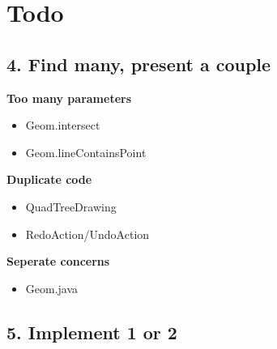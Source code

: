\section{Todo}
\subsection{4. Find many, present a couple}

\begin{flushleft}
\textbf{Too many parameters}
\begin{itemize}
	\item Geom.intersect
	\item Geom.lineContainsPoint
\end{itemize}
\end{flushleft}

\begin{flushleft}
\textbf{Duplicate code}
\begin{itemize}
	\item QuadTreeDrawing
	\item RedoAction/UndoAction
\end{itemize}
\end{flushleft}

\begin{flushleft}
\textbf{Seperate concerns}
\begin{itemize}
	\item Geom.java
\end{itemize}
\end{flushleft}

\subsection{5. Implement 1 or 2}
